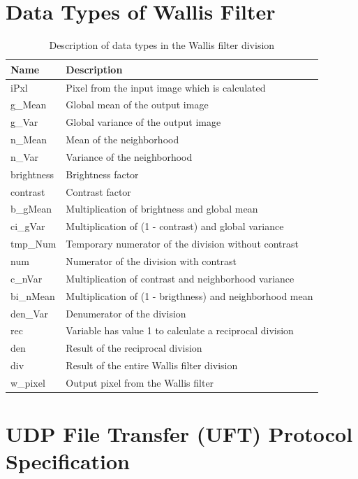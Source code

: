 \section{Data Types of Wallis Filter} \label{app:datatypes}
\begin{table}[H]
    \centering
    \begin{tabularx}{\textwidth}{l l}
        \toprule
        Name & Description \\
        \midrule
        iPxl & 			Pixel from the input image which is calculated \\
        g\_Mean &  		Global mean of the output image \\
        g\_Var &  		Global variance of the output image \\
        n\_Mean &		Mean of the neighborhood \\
        n\_Var &  		Variance of the neighborhood \\
        brightness & 	Brightness factor \\
        contrast & 		Contrast factor \\
        b\_gMean &  	Multiplication of brightness and global mean\\
        ci\_gVar &  	Multiplication of (1 - contrast) and global variance\\
        tmp\_Num &  	Temporary numerator of the division without contrast\\
        num &   		Numerator of the division with contrast\\
        c\_nVar &  		Multiplication of contrast and neighborhood variance\\
        bi\_nMean &  	Multiplication of (1 - brigthness) and neighborhood mean\\
        den\_Var & 		Denumerator of the division \\
        rec & 			Variable has value 1 to calculate a reciprocal division\\
        den & 			Result of the reciprocal division\\
        div &  			Result of the entire Wallis filter division\\
        w\_pixel &  	Output pixel from the Wallis filter\\
        \bottomrule
    \end{tabularx}
    \caption{Description of data types in the Wallis filter division}
\end{table}

\clearpage

\section{UDP File Transfer (UFT) Protocol Specification} \label{app:uftspec}


